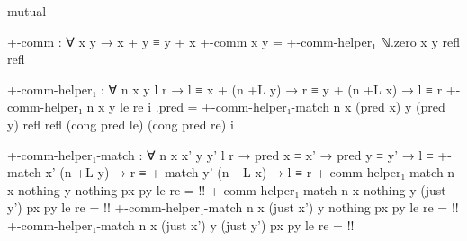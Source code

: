 \begin{code}[hide]
mutual
\end{code}
\begin{code}
  +-comm : ∀ x y → x + y ≡ y + x
  +-comm x y = +-comm-helper₁ ℕ.zero x y refl refl

  +-comm-helper₁ :
    ∀ n x y {l r} → l ≡ x + (n +L y) → r ≡ y + (n +L x) → l ≡ r
  +-comm-helper₁ n x y le re i .pred =
    +-comm-helper₁-match n x (pred x) y (pred y)
      refl refl (cong pred le) (cong pred re) i

  +-comm-helper₁-match :
    ∀ n x x' y y' {l r} →
    pred x ≡ x' → pred y ≡ y' →
    l ≡ +-match x' (n +L y) → r ≡ +-match y' (n +L x) →
    l ≡ r
  +-comm-helper₁-match n x nothing y nothing px py le re = {!!}
  +-comm-helper₁-match n x nothing y (just y') px py le re = {!!}
  +-comm-helper₁-match n x (just x') y nothing px py le re = {!!}
  +-comm-helper₁-match n x (just x') y (just y') px py le re =
    {!!}
\end{code}
